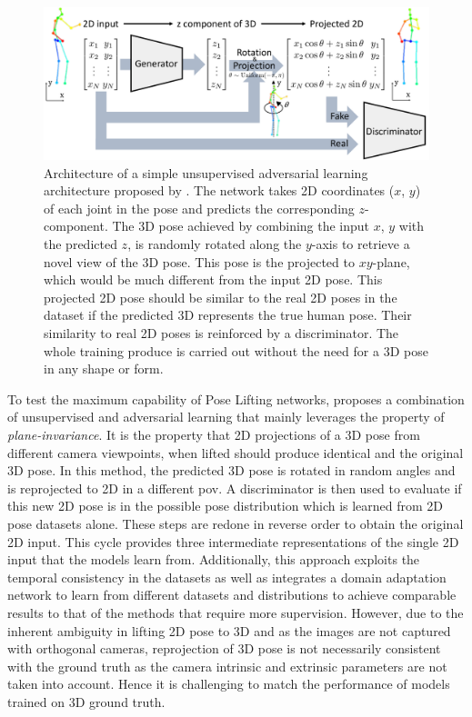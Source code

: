 \begin{figure}[h]
    \centering
    \includegraphics[width=\linewidth]{figures/background/adverserial_arch.pdf}
    \caption{Architecture of a simple unsupervised adversarial learning architecture proposed by \cite{unsupervisedAdversarial}. The network takes 2D coordinates ($x$, $y$) of each joint in the pose and predicts the corresponding $z$-component. The 3D pose achieved by combining the input $x$, $y$ with the predicted $z$, is randomly rotated along the $y$-axis to retrieve a novel view of the 3D pose. This pose is the projected to $xy$-plane, which would be much different from the input 2D pose. This projected 2D pose should be similar to the real 2D poses in the dataset if the predicted 3D represents the true human pose. Their similarity to real 2D poses is reinforced by a discriminator. The whole training produce is carried out without the need for a 3D pose in any shape or form.}
    \label{fig:adverserial_arch}
\end{figure}

To test the maximum capability of Pose Lifting networks, \cite{amazon1} proposes a combination of unsupervised and adversarial learning that mainly leverages the property of \textit{plane-invariance}. It is the property that 2D projections of a 3D pose from different camera viewpoints, when lifted should produce identical and the original 3D pose. In this method, the predicted 3D pose is rotated in random angles and is reprojected to 2D in a different \ac{pov}. A discriminator is then used to evaluate if this new 2D pose is in the possible pose distribution which is learned from 2D pose datasets alone. These steps are redone in reverse order to obtain the original 2D input. This cycle provides three intermediate representations of the single 2D input that the models learn from. Additionally, this approach exploits the temporal consistency in the datasets as well as integrates a domain adaptation network to learn from different datasets and distributions to achieve comparable results to that of the methods that require more supervision. However, due to the inherent ambiguity in lifting 2D pose to 3D and as the images are not captured with orthogonal cameras, reprojection of 3D pose is not necessarily consistent with the ground truth as the camera intrinsic and extrinsic parameters are not taken into account. Hence it is challenging to match the performance of models trained on 3D ground truth.

